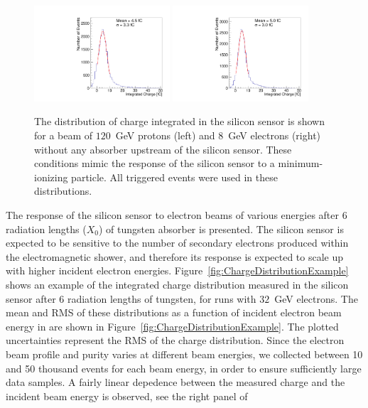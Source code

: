 \begin{figure}[h] 
\centering
\includegraphics[width=0.45\textwidth]{plots/Proton_charge.pdf} 
\includegraphics[width=0.45\textwidth]{plots/Electron_0X0_charge.pdf} 
\caption{The distribution of charge integrated in the silicon sensor is shown
for a beam of $120$~GeV protons (left) and $8$~GeV electrons (right) without any
absorber upstream of the silicon sensor. These conditions mimic the response of the silicon sensor to a
minimum-ionizing particle. All triggered events were used in these
distributions.} 
\label{fig:MIP} 
\end{figure} 
The response of the silicon sensor to electron beams of various
energies after 6 radiation lengths ($X_0$) of tungsten absorber is presented. The silicon
sensor is expected to be sensitive to the number of secondary electrons produced
within the electromagnetic shower, and therefore its response is expected to
scale up with higher incident electron
energies. Figure~\ref{fig:ChargeDistributionExample} shows an example of the integrated
charge distribution measured in the silicon sensor after 6 radiation lengths of
tungsten, for runs with $32$~GeV electrons. The mean and RMS of
these distributions as a function of incident electron beam energy in
are shown in Figure~\ref{fig:ChargeDistributionExample}. The plotted uncertainties represent the RMS of the
charge distribution. Since the electron beam profile and purity varies at different beam energies, we collected between 10 and 50 thousand events for each beam energy, in order to ensure sufficiently large data samples. A fairly linear depedence between the measured
charge and the incident beam energy is observed, see the right panel of
